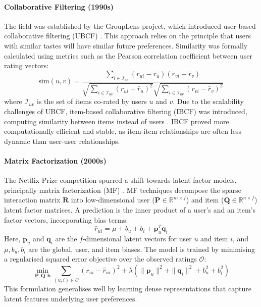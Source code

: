 \paragraph{Collaborative Filtering (1990s)} The field was established by the GroupLens project, which introduced user-based collaborative filtering (UBCF) \cite{resnick1994grouplens}. This approach relies on the principle that users with similar tastes will have similar future preferences. Similarity was formally calculated using metrics such as the Pearson correlation coefficient between user rating vectors:
\begin{equation}
\text{sim}(u,v) = \frac{\sum_{i \in \mathcal{I}_{uv}}(r_{ui} - \bar{r}_u)(r_{vi} - \bar{r}_v)}{\sqrt{\sum_{i \in \mathcal{I}_{uv}}(r_{ui} - \bar{r}_u)^2}\sqrt{\sum_{i \in \mathcal{I}_{uv}}(r_{vi} - \bar{r}_v)^2}}
\end{equation}
where $\mathcal{I}_{uv}$ is the set of items co-rated by users $u$ and $v$. Due to the scalability challenges of UBCF, item-based collaborative filtering (IBCF) was introduced, computing similarity between items instead of users \cite{sarwar2001item}. IBCF proved more computationally efficient and stable, as item-item relationships are often less dynamic than user-user relationships.

\paragraph{Matrix Factorization (2000s)} The Netflix Prize competition spurred a shift towards latent factor models, principally matrix factorization (MF) \cite{koren2009matrix}. MF techniques decompose the sparse interaction matrix $\mathbf{R}$ into low-dimensional user ($\mathbf{P} \in \mathbb{R}^{m \times f}$) and item ($\mathbf{Q} \in \mathbb{R}^{n \times f}$) latent factor matrices. A prediction is the inner product of a user's and an item's factor vectors, incorporating bias terms:
\begin{equation}
\hat{r}_{ui} = \mu + b_u + b_i + \mathbf{p}_u^T \mathbf{q}_i
\end{equation}
Here, $\mathbf{p}_u$ and $\mathbf{q}_i$ are the $f$-dimensional latent vectors for user $u$ and item $i$, and $\mu, b_u, b_i$ are the global, user, and item biases. The model is trained by minimising a regularised squared error objective over the observed ratings $\mathcal{O}$:
\begin{equation}
\min_{\mathbf{P},\mathbf{Q},\mathbf{b}} \sum_{(u,i) \in \mathcal{O}} (r_{ui} - \hat{r}_{ui})^2 + \lambda(\|\mathbf{p}_u\|^2 + \|\mathbf{q}_i\|^2 + b_u^2 + b_i^2)
\end{equation}
This formulation generalises well by learning dense representations that capture latent features underlying user preferences.

